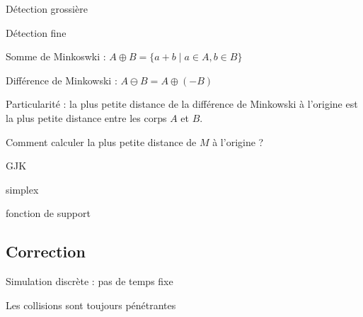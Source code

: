 \documentclass{beamer}
\begin{document}
\begin{frame}
  Détection grossière

  \begin{figure}
    \centering
    
    
    
  \end{figure}
\end{frame}

\begin{frame}
  Détection fine

  Somme de Minkoswki : $A \oplus B = \{a + b \mid a \in A, b \in B\}$

  Différence de Minkowski : $A \ominus B = A \oplus (-B)$

  \begin{figure}
    \centering
    
    
  \end{figure}

  Particularité : la plus petite distance de la différence de Minkowski à l'origine est la plus petite distance entre les corps $A$ et $B$.
\end{frame}

\begin{frame}
  Comment calculer la plus petite distance de $M$ à l'origine ?

  GJK

  simplex
\end{frame}

\begin{frame}
  fonction de support

  
\end{frame}

\begin{frame}
  \begin{figure}
    \centering
    
    
    
    
    
    
  \end{figure}
\end{frame}

\subsection{Correction}

\begin{frame}
  Simulation discrète : pas de temps fixe

  Les collisions sont toujours pénétrantes

  \begin{figure}
    \centering
    
  \end{figure}
\end{frame}
\end{document}

